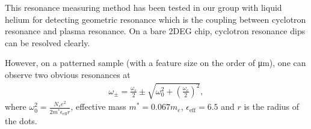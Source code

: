 \documentclass[12pt]{ruthesis}
\begin{document}
This resonance measuring method has been tested in our group with liquid helium for detecting geometric resonance which is the coupling between cyclotron resonance and plasma resonance. 
On a bare 2DEG chip, cyclotron resonance dips can be resolved clearly.


However, on a patterned sample (with a feature size on the order of \si{\micro\meter}), one can observe two obvious resonances at
\begin{align}
\omega_{\pm}=\frac{\omega_{c}}{2} \pm \sqrt{ \omega_{0}^{2}+ \left(\frac{ \omega_{c} }{2}\right)^{2}},
\end{align}
where $\displaystyle \omega_{0}^{2}=\frac{N_{s}e^{2}}{2m^{\ast}\epsilon_{\mathrm{eff}}r}$, effective mass $m^{*}=0.067m_{e}$, $\epsilon_{\mathrm{eff}}=6.5$ and $r$ is the radius of the dots. 
\end{document}
